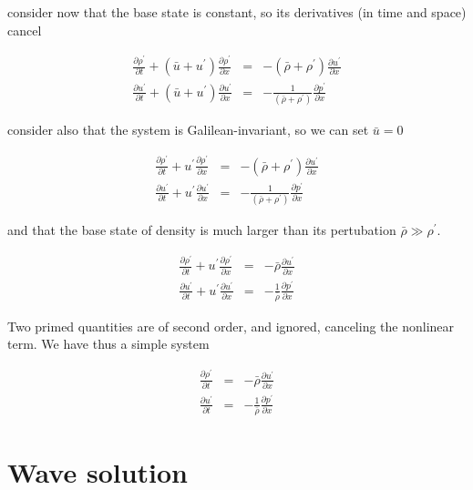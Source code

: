 consider now that the base state is constant, so its derivatives (in time and space) cancel 


\begin{eqnarray}
\frac{\partial \rho^\prime}{\partial t}  + (\bar{u}+u^\prime)\frac{\partial \rho^\prime}{\partial x} &=& -(\bar{\rho}+\rho^\prime)\frac{\partial u^\prime}{\partial x}   \\
\frac{\partial u^\prime}{\partial t}  +  (\bar{u}+u^\prime)\frac{\partial u^\prime}{\partial x} &=& -\frac{1}{(\bar{\rho}+\rho^\prime)} \frac{\partial p^\prime}{\partial x} 
\end{eqnarray}

consider also that the system is Galilean-invariant, so we can set $\bar{u}=0$ 

\begin{eqnarray}
\frac{\partial \rho^\prime}{\partial t}  + u^\prime\frac{\partial \rho^\prime}{\partial x} &=& -(\bar{\rho}+\rho^\prime)\frac{\partial u^\prime}{\partial x}   \\
\frac{\partial u^\prime}{\partial t}  +  u^\prime\frac{\partial u^\prime}{\partial x} &=& -\frac{1}{(\bar{\rho}+\rho^\prime)} \frac{\partial p^\prime}{\partial x} 
\end{eqnarray}

and that the base state of density is much larger than its pertubation $\bar{\rho}\gg \rho^\prime$. 

\begin{eqnarray}
\frac{\partial \rho^\prime}{\partial t}  + u^\prime\frac{\partial \rho^\prime}{\partial x} &=& -\bar{\rho}\frac{\partial u^\prime}{\partial x}   \\
\frac{\partial u^\prime}{\partial t}  +  u^\prime\frac{\partial u^\prime}{\partial x} &=& -\frac{1}{\bar{\rho}} \frac{\partial p^\prime}{\partial x} 
\end{eqnarray}

Two primed quantities are of second order, and ignored, canceling the nonlinear term. We have thus a simple system 

\begin{eqnarray}
\frac{\partial \rho^\prime}{\partial t}   &=& -\bar{\rho}\frac{\partial u^\prime}{\partial x}   \\
\frac{\partial u^\prime}{\partial t}   &=& -\frac{1}{\bar{\rho}} \frac{\partial p^\prime}{\partial x} 
\end{eqnarray}

\section{Wave solution}

